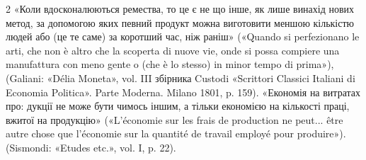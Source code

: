 2 «Коли вдосконалюються ремества, то це є не що інше, як лише
винахід нових метод, за допомогою яких певний продукт можна виготовити
меншою кількістю людей або (це те саме) за коротший час, ніж
раніш» («Quando si perfezionano le arti, che non è altro che la scoperta
di nuove vie, onde si possa compiere una manufattura con meno gente o
(che è lo stesso) in minor tempo di prima»), (Galiani: «Délia Moneta»,
vol. III збірника Custodi «Scrittori Classici Italiani di Economia Politica».
Parte Moderna. Milano 1801, p. 159). «Економія на витратах про:
дукції не може бути чимось іншим, а тільки економією на кількості
праці, вжитої на продукцію» («L'économie sur les frais de production
ne peut... être autre chose que l’économie sur la quantité de travail employé
pour produire»). (Sismondi: «Etudes etc.», vol. I, p. 22).
\parbreak{}  %
